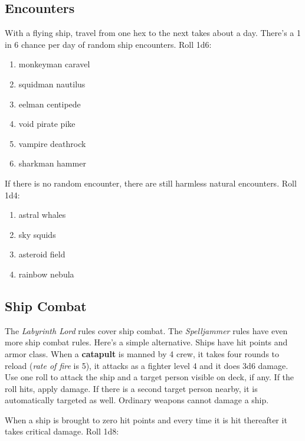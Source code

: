 \documentclass[11pt]{bxart}
\begin{document}
\subsection{Encounters}

With a flying ship, travel from one hex to the next takes about a day.
There's a 1 in 6 chance per day of random ship encounters. Roll 1d6:

\begin{enumerate}
\item monkeyman caravel
\item squidman nautilus
\item eelman centipede
\item void pirate pike
\item vampire deathrock 
\item sharkman hammer
\end{enumerate}

If there is no random encounter, there are still harmless natural
encounters. Roll 1d4:

\begin{enumerate}
\item astral whales
\item sky squids
\item asteroid field
\item rainbow nebula
\end{enumerate}

\subsection{Ship Combat}
\label{sec:ship-combat}

The \textit{Labyrinth Lord} rules cover ship combat. The
\textit{Spelljammer} rules have even more ship combat rules. Here's a
simple alternative. Ships have hit points and armor class. When a
\textbf{catapult} is manned by 4 crew, it takes four rounds to reload
(\textit{rate of fire} is 5), it attacks as a fighter level 4 and it
does 3d6 damage. Use one roll to attack the ship and a target person
visible on deck, if any. If the roll hits, apply damage. If there is a
second target person nearby, it is automatically targeted as well.
Ordinary weapons cannot damage a ship.

When a ship is brought to zero hit points and every time it is hit
thereafter it takes critical damage. Roll 1d8:
\end{document}
